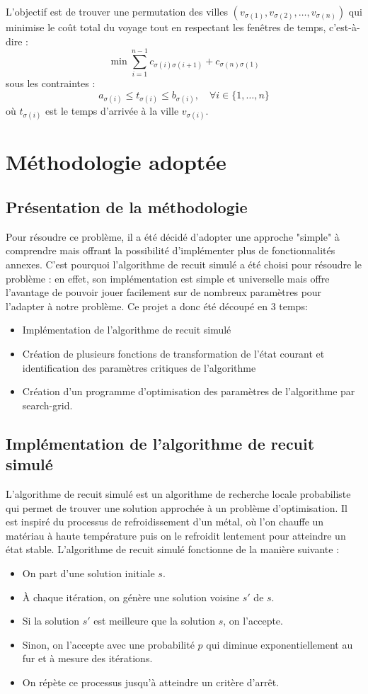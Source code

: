 \documentclass[a4paper, 12pt]{article}
\begin{document}
L'objectif est de trouver une permutation des villes $(v_{\sigma(1)}, v_{\sigma(2)}, \ldots, v_{\sigma(n)})$ qui minimise le coût total du voyage tout en respectant les fenêtres de temps, c'est-à-dire :
\[
\min \sum_{i=1}^{n-1} c_{\sigma(i)\sigma(i+1)} + c_{\sigma(n)\sigma(1)}
\]
sous les contraintes :
\[
a_{\sigma(i)} \leq t_{\sigma(i)} \leq b_{\sigma(i)}, \quad \forall i \in \{1, \ldots, n\}
\]
où $t_{\sigma(i)}$ est le temps d'arrivée à la ville $v_{\sigma(i)}$.


\section{Méthodologie adoptée}
\subsection{Présentation de la méthodologie}
Pour résoudre ce problème, il a été décidé d'adopter une approche "simple" à comprendre mais offrant la possibilité d'implémenter plus de fonctionnalités annexes.
C'est pourquoi l'algorithme de recuit simulé a été choisi pour résoudre le problème : en effet, son implémentation est simple et universelle mais offre l'avantage de pouvoir jouer
facilement sur de nombreux paramètres pour l'adapter à notre problème.
Ce projet a donc été découpé en 3 temps:
\begin{itemize}
    \item Implémentation de l'algorithme de recuit simulé
    \item Création de plusieurs fonctions de transformation de l'état courant et identification des paramètres critiques de l'algorithme
    \item Création d'un programme d'optimisation des paramètres de l'algorithme par search-grid.
\end{itemize}

\subsection{Implémentation de l'algorithme de recuit simulé}
L'algorithme de recuit simulé est un algorithme de recherche locale probabiliste qui permet de trouver une solution approchée à un problème d'optimisation.
Il est inspiré du processus de refroidissement d'un métal, où l'on chauffe un matériau à haute température puis on le refroidit lentement pour atteindre un état stable.
L'algorithme de recuit simulé fonctionne de la manière suivante :
\begin{itemize}
    \item On part d'une solution initiale $s$.
    \item À chaque itération, on génère une solution voisine $s'$ de $s$.
    \item Si la solution $s'$ est meilleure que la solution $s$, on l'accepte.
    \item Sinon, on l'accepte avec une probabilité $p$ qui diminue exponentiellement au fur et à mesure des itérations.
    \item On répète ce processus jusqu'à atteindre un critère d'arrêt.
\end{itemize}
\end{document}
